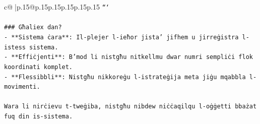 \documentclass{article}
\begin{document}
{\begin{supertabular}{c@{$\;$}|p{.15\linewidth}@{}p{.15\linewidth}p{.15\linewidth}p{.15\linewidth}p{.15\linewidth}p{.15\linewidth}}
{{{\texttt{```} \\
\\ 
\texttt{\#\#\# Għaliex dan?} \\
\texttt{{-} **Sistema ċara**: Il{-}plejer l{-}ieħor jista' jifhem u jirreġistra l{-}istess sistema.} \\
\texttt{{-} **Effiċjenti**: B'mod li nistgħu nitkellmu dwar numri sempliċi flok koordinati komplet.} \\
\texttt{{-} **Flessibbli**: Nistgħu nikkoreġu l{-}istrateġija meta jiġu mqabbla l{-}movimenti.} \\
\\ 
\texttt{Wara li nirċievu t{-}tweġiba, nistgħu nibdew niċċaqilqu l{-}oġġetti bbażat fuq din is{-}sistema.} \\
            }
        }
    }
     \\ \\


\end{supertabular}}
\end{document}
